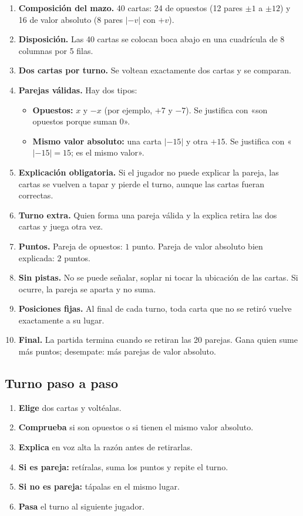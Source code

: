 \documentclass[12pt, letterpaper]{article}
\newcommand{\abs}[1]{\lvert #1\rvert}
\begin{document}
\begin{enumerate}[leftmargin=*]
  \item \textbf{Composición del mazo.} 40 cartas: 24 de opuestos (12 pares $\pm1$ a $\pm12$) y 16 de valor absoluto (8 pares $\abs{-v}$ con $+v$).
  \item \textbf{Disposición.} Las 40 cartas se colocan boca abajo en una cuadrícula de 8 columnas por 5 filas.
  \item \textbf{Dos cartas por turno.} Se voltean exactamente dos cartas y se comparan.
  \item \textbf{Parejas válidas.} Hay dos tipos:
  \begin{itemize}
    \item \textbf{Opuestos:} $x$ y $-x$ (por ejemplo, $+7$ y $-7$). Se justifica con «son opuestos porque suman $0$».
    \item \textbf{Mismo valor absoluto:} una carta $\abs{-15}$ y otra $+15$. Se justifica con «$\abs{-15}=15$; es el mismo valor».
  \end{itemize}
  \item \textbf{Explicación obligatoria.} Si el jugador no puede explicar la pareja, las cartas se vuelven a tapar y pierde el turno, aunque las cartas fueran correctas.
  \item \textbf{Turno extra.} Quien forma una pareja válida y la explica retira las dos cartas y juega otra vez.
  \item \textbf{Puntos.} Pareja de opuestos: $1$ punto. Pareja de valor absoluto bien explicada: $2$ puntos.
  \item \textbf{Sin pistas.} No se puede señalar, soplar ni tocar la ubicación de las cartas. Si ocurre, la pareja se aparta y no suma.
  \item \textbf{Posiciones fijas.} Al final de cada turno, toda carta que no se retiró vuelve exactamente a su lugar.
  \item \textbf{Final.} La partida termina cuando se retiran las 20 parejas. Gana quien sume más puntos; desempate: más parejas de valor absoluto.
\end{enumerate}

\subsection{Turno paso a paso}

\begin{enumerate}[leftmargin=*]
  \item \textbf{Elige} dos cartas y voltéalas.
  \item \textbf{Comprueba} si son opuestos o si tienen el mismo valor absoluto.
  \item \textbf{Explica} en voz alta la razón antes de retirarlas.
  \item \textbf{Si es pareja:} retíralas, suma los puntos y repite el turno.
  \item \textbf{Si no es pareja:} tápalas en el mismo lugar.
  \item \textbf{Pasa} el turno al siguiente jugador.
\end{enumerate}
\end{document}
